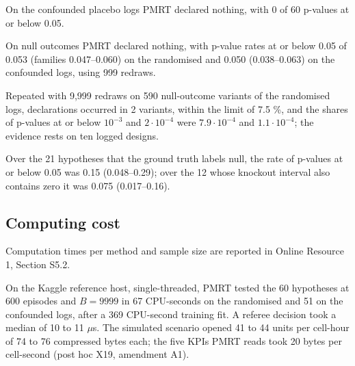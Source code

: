 On the confounded placebo logs PMRT declared nothing, with 0 of 60 p-values at or below 0.05.

On null outcomes PMRT declared nothing, with p-value rates at or below 0.05 of 0.053 (families 0.047--0.060) on the randomised and 0.050 (0.038--0.063) on the confounded logs, using 999 redraws.

Repeated with 9,999 redraws on 590 null-outcome variants of the randomised logs, declarations occurred in 2 variants, within the limit of 7.5 \%, and the shares of p-values at or below $10^{-3}$ and $2 \cdot 10^{-4}$ were $7.9 \cdot 10^{-4}$ and $1.1 \cdot 10^{-4}$; the evidence rests on ten logged designs.

Over the 21 hypotheses that the ground truth labels null, the rate of p-values at or below 0.05 was 0.15 (0.048--0.29); over the 12 whose knockout interval also contains zero it was 0.075 (0.017--0.16).

\subsection{Computing cost}
\label{spec:met.cost}

Computation times per method and sample size are reported in Online Resource 1, Section S5.2.

On the Kaggle reference host, single-threaded, PMRT tested the 60 hypotheses at 600 episodes and $B = 9999$ in 67 CPU-seconds on the randomised and 51 on the confounded logs, after a 369 CPU-second training fit. A referee decision took a median of 10 to 11 $\mu$s. The simulated scenario opened 41 to 44 units per cell-hour of 74 to 76 compressed bytes each; the five KPIs PMRT reads took 20 bytes per cell-second (post hoc X19, amendment A1).
